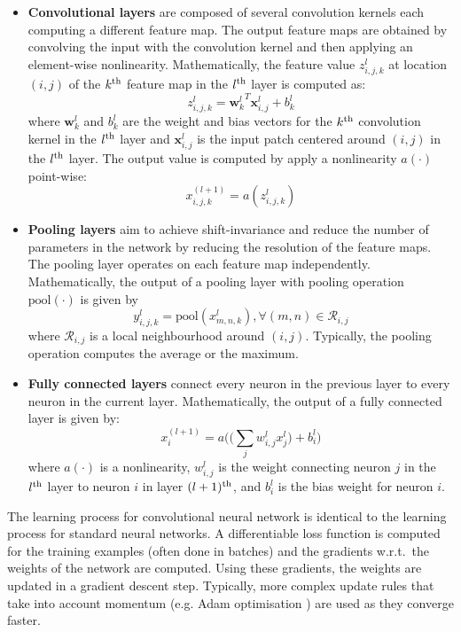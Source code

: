 \documentclass{article}
\begin{document}
\begin{itemize}
	\item \textbf{Convolutional layers} are composed of  several 	convolution kernels each computing a different feature map. The output feature maps are obtained by convolving the input with the convolution kernel and then applying an element-wise nonlinearity. Mathematically, the feature value $z_{i,j,k}^l$ at location $(i,j)$ of the $k\textsuperscript{th}$ feature map in the $l\textsuperscript{th}$ layer is computed as:
	\[z_{i,j,k}^l = {\mathbf{w}_k^l}^T \mathbf{x}_{i,j}^l + b_k^l\]
	where  $\mathbf{w}_k^l$ and $b_k^l$ are the weight and bias vectors for the $k\textsuperscript{th}$ convolution kernel in the $l\textsuperscript{th}$ layer and $\mathbf{x}_{i,j}^l$ is the input patch centered around $(i,j)$ in the $l\textsuperscript{th}$ layer. The output value is computed by apply a nonlinearity $a(\cdot)$ point-wise:
	\[x_{i,j,k}^{(l+1)} = a(z_{i,j,k}^l) \]

	\item \textbf{Pooling layers} aim to achieve shift-invariance and reduce the number of parameters in the network by reducing the resolution of the feature maps. The pooling layer operates on each feature map independently. Mathematically, the output of a pooling layer with pooling operation $\textrm{pool}(\cdot)$ is given by 
	\[ y_{i,j,k}^l = \textrm{pool}(x^l_{m,n,k}), \forall (m,n) \in \mathcal{R}_{i,j}\]
	where $\mathcal{R}_{i,j}$ is a local neighbourhood around $(i,j)$. Typically, the pooling operation computes the average or the maximum.
	
	\item \textbf{Fully connected layers} connect every neuron in the previous layer to every neuron in the current layer. Mathematically, the output of a fully connected layer is given by:
	\[ x^{(l+1)}_i = a\Big(\big( \sum_j w_{i,j}^l x^l_j \big) + b^l_i\big)\]
	where $a(\cdot)$ is a nonlinearity, $w_{i,j}^l$ is the weight connecting neuron $j$ in the $l\textsuperscript{th}$ layer to neuron $i$ in layer $(l+1)\textsuperscript{th}$, and $b_i^l$ is the bias weight for neuron $i$.
\end{itemize}
The learning process for convolutional neural network is identical to the learning process for standard neural networks. A differentiable loss function is computed for the training examples (often done in batches) and the gradients w.r.t.\ the weights of the network are computed. Using these gradients, the weights are updated in a gradient descent step. Typically, more complex update rules that take into account momentum (e.g. Adam optimisation \cite{adam}) are used as they converge faster. 
\end{document}
